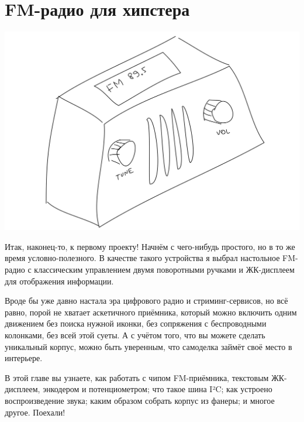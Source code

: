 \chapter{FM-радио для хипстера}

\includegraphics{sketches/fm-radio}

%
%

Итак, наконец-то, к первому проекту! Начнём с чего-нибудь простого, но в то же время условно-полезного. В качестве такого устройства я выбрал настольное FM-радио с классическим управлением двумя поворотными ручками и ЖК-дисплеем для отображения информации.

Вроде бы уже давно настала эра цифрового радио и стриминг-сервисов, но всё равно, порой не хватает аскетичного приёмника, который можно включить одним движением без поиска нужной иконки, без сопряжения с беспроводными колонками, без всей этой суеты. А с учётом того, что вы можете сделать уникальный корпус, можно быть уверенным, что самоделка займёт своё место в интерьере.

В этой главе вы узнаете, как работать с чипом FM-приёмника, текстовым ЖК-дисплеем, энкодером и потенциометром; что такое шина I²C; как устроено воспроизведение звука; каким образом собрать корпус из фанеры; и многое другое. Поехали!

